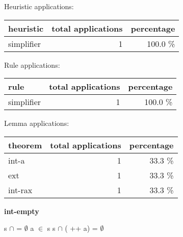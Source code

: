 \documentclass[a4paper]{article}
\begin{document}
\medskip


Heuristic applications:

\begin{supertabular}{l|r|r}
heuristic	& total applications & percentage \\ \hline
simplifier & 1 & 100.0 \% \\

\end{supertabular}

Rule applications:

\begin{supertabular}{l|r|r}
rule	        & total applications & percentage \\ \hline
simplifier & 1 & 100.0 \% \\

\end{supertabular}

Lemma applications:

\begin{supertabular}{l|r|r}
theorem	        & total applications & percentage \\ \hline
int-a & 1 & 33.3 \% \\
ext & 1 & 33.3 \% \\
int-rax & 1 & 33.3 \% \\

\end{supertabular}
\pagebreak

{\LARGE\bf int-empty}\label{lemma-int-empty}

\medskip

 \Fol s $\cap$  = $\emptyset$ \And \Not a $\in$ s \Imp s $\cap$ ( ++ a) = $\emptyset$
\end{document}
